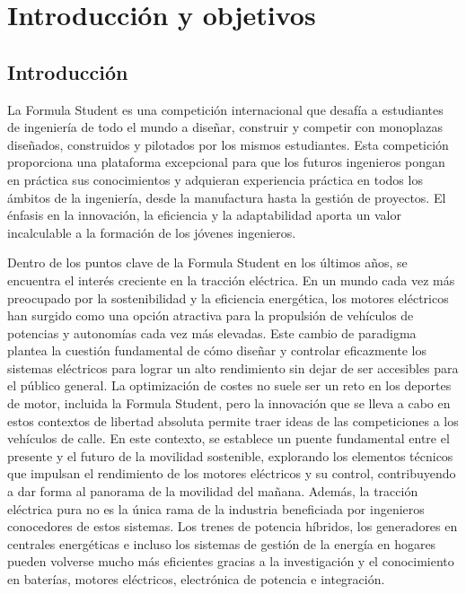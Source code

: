 \chapter{Introducción y objetivos}

\section{Introducción}
La Formula Student es una competición internacional que desafía a estudiantes de ingeniería de todo el mundo a diseñar, construir y competir con monoplazas diseñados, construidos y pilotados por los mismos estudiantes. Esta competición proporciona una plataforma excepcional para que los futuros ingenieros pongan en práctica sus conocimientos y adquieran experiencia práctica en todos los ámbitos de la ingeniería, desde la manufactura hasta la gestión de proyectos. El énfasis en la innovación, la eficiencia y la adaptabilidad aporta un valor incalculable a la formación de los jóvenes ingenieros.

Dentro de los puntos clave de la Formula Student en los últimos años, se encuentra el interés creciente en la tracción eléctrica. En un mundo cada vez más preocupado por la sostenibilidad y la eficiencia energética, los motores eléctricos han surgido como una opción atractiva para la propulsión de vehículos de potencias y autonomías cada vez más elevadas. Este cambio de paradigma plantea la cuestión fundamental de cómo diseñar y controlar eficazmente los sistemas eléctricos para lograr un alto rendimiento sin dejar de ser accesibles para el público general. La optimización de costes no suele ser un reto en los deportes de motor, incluida la Formula Student, pero la innovación que se lleva a cabo en estos contextos de libertad absoluta permite traer ideas de las competiciones a los vehículos de calle. En este contexto, se establece un puente fundamental entre el presente y el futuro de la movilidad sostenible, explorando los elementos técnicos que impulsan el rendimiento de los motores eléctricos y su control, contribuyendo a dar forma al panorama de la movilidad del mañana. Además, la tracción eléctrica pura no es la única rama de la industria beneficiada por ingenieros conocedores de estos sistemas. Los trenes de potencia híbridos, los generadores en centrales energéticas e incluso los sistemas de gestión de la energía en hogares pueden volverse mucho más eficientes gracias a la investigación y el conocimiento en baterías, motores eléctricos, electrónica de potencia e integración.

